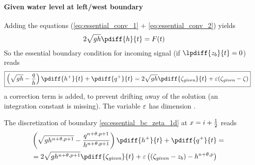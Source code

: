 %
\paragraph*{Given water level at left/west boundary}


Adding the equations (\eqref{eq:essential_conv_1} $+$ \eqref{eq:essential_conv_2}) yields
\begin{align}
    2 \sqrt{gh} \pdiff{h}{t} & = F(t)
\end{align}
%
So the essential boundary condition for incoming signal (if $\lpdiff{z_b}{t} = 0$) reads
\begin{align}
    {\boxed{
            \left(\sqrt{gh} - \frac{q}{h}\right) \pdiff{h^{+}}{t} + \pdiff{q^{+}}{t}  = 2 \sqrt{gh} \pdiff{\zeta_{\textit{given}}}{t}  + \eps(\zeta_{\textit{given}} - \zeta)
    }}\label{eq:essential_bc_zeta_1d}
\end{align}
a correction term is added, to prevent drifting away of the solution (an integration constant is missing).
The variable $\varepsilon$ has dimension \bunit{\metre\per\square\second}.

The discretization of  boundary \autoref{eq:essential_bc_zeta_1d} at $x=i+\frac{1}{2}$ reads
\begin{align}
    &\left(\sqrt{gh^{n+\theta,p+1}} - \frac{q^{n+\theta,p+1}}{h^{n+\theta,p+1}}\right) \pdiff{h^{+}}{t} + \pdiff{q^{+}}{t}  =
    \nonumber \\*
    & = 2 \sqrt{gh^{n+\theta,p+1}} \pdiff{\zeta_{\textit{given}}}{t}
    + \eps \left( (\zeta_{\textit{given}} -z_b) - h^{n+\theta,p}   \right)
\end{align}

%
